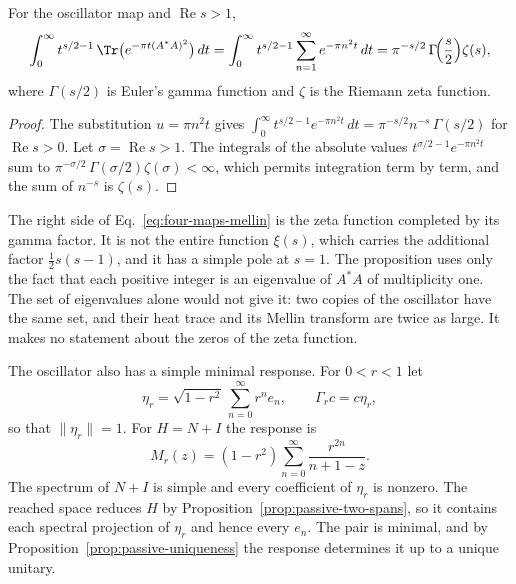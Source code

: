 \begin{proposition}
\label{prop:four-maps-mellin}
For the oscillator map and $\operatorname{Re}s>1$,
\begin{equation}
 \int_0^\infty t^{s/2-1}\,\Tr\bigl(e^{-\pi t(A^*A)^2}\bigr)\,dt
   =\int_0^\infty t^{s/2-1}\sum_{n=1}^\infty e^{-\pi n^2t}\,dt
   =\pi^{-s/2}\,\Gamma\!\Bigl(\frac s2\Bigr)\zeta(s),
 \label{eq:four-maps-mellin}
\end{equation}
where $\Gamma(s/2)$ is Euler's gamma function and $\zeta$ is the Riemann zeta function.
\end{proposition}
\begin{proof}
The substitution $u=\pi n^2t$ gives $\int_0^\infty t^{s/2-1}e^{-\pi n^2t}\,dt=\pi^{-s/2}n^{-s}\,\Gamma(s/2)$ for $\operatorname{Re}s>0$. Let $\sigma=\operatorname{Re}s>1$. The integrals of the absolute values $t^{\sigma/2-1}e^{-\pi n^2t}$ sum to $\pi^{-\sigma/2}\,\Gamma(\sigma/2)\zeta(\sigma)<\infty$, which permits integration term by term, and the sum of $n^{-s}$ is $\zeta(s)$.
\end{proof}

The right side of Eq.~\eqref{eq:four-maps-mellin} is the zeta function completed by its gamma factor. It is not the entire function $\xi(s)$, which carries the additional factor $\frac12s(s-1)$, and it has a simple pole at $s=1$. The proposition uses only the fact that each positive integer is an eigenvalue of $A^*A$ of multiplicity one. The set of eigenvalues alone would not give it: two copies of the oscillator have the same set, and their heat trace and its Mellin transform are twice as large. It makes no statement about the zeros of the zeta function.

The oscillator also has a simple minimal response. For $0<r<1$ let
\begin{equation}
 \eta_r=\sqrt{1-r^2}\,\sum_{n=0}^\infty r^ne_n,\qquad\Gamma_rc=c\eta_r ,
 \label{eq:four-maps-oscillator-port}
\end{equation}
so that $\|\eta_r\|=1$. For $H=N+I$ the response is
\begin{equation}
 M_r(z)=(1-r^2)\sum_{n=0}^\infty\frac{r^{2n}}{n+1-z}.
 \label{eq:four-maps-oscillator-response}
\end{equation}
The spectrum of $N+I$ is simple and every coefficient of $\eta_r$ is nonzero. The reached space reduces $H$ by Proposition~\ref{prop:passive-two-spans}, so it contains each spectral projection of $\eta_r$ and hence every $e_n$. The pair is minimal, and by Proposition~\ref{prop:passive-uniqueness} the response determines it up to a unique unitary.

